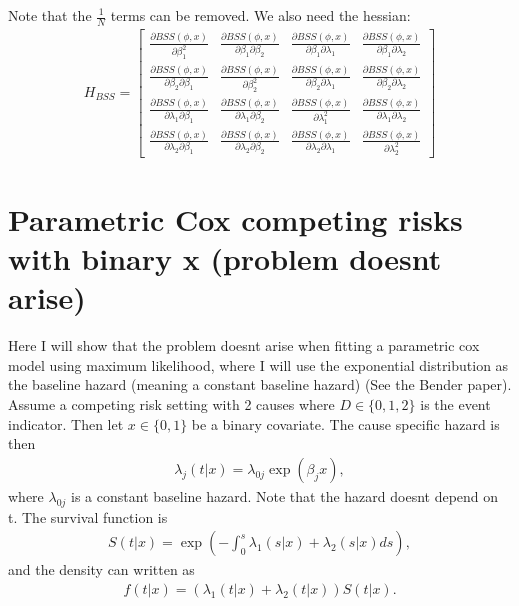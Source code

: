 \documentclass[11pt]{article}
\begin{document}
Note that the \(\frac{1}{N}\) terms can be removed. We also need the hessian:
\begin{align*}
H_{BSS} = 
\begin{bmatrix}
\frac{\partial BSS(\phi,x)}{\partial\beta_1^2} & \frac{\partial BSS(\phi,x)}{\partial\beta_1\partial\beta_2} & \frac{\partial BSS(\phi,x)}{\partial\beta_1\partial\lambda_1} & \frac{\partial BSS(\phi,x)}{\partial\beta_1\partial\lambda_2}\\
\frac{\partial BSS(\phi,x)}{\partial\beta_2\partial\beta_1} & \frac{\partial BSS(\phi,x)}{\partial\beta_2^2} & \frac{\partial BSS(\phi,x)}{\partial\beta_2\partial\lambda_1} & \frac{\partial BSS(\phi,x)}{\partial\beta_2\partial\lambda_2} \\
\frac{\partial BSS(\phi,x)}{\partial\lambda_1\partial\beta_1} & \frac{\partial BSS(\phi,x)}{\partial\lambda_1\partial\beta_2} & \frac{\partial BSS(\phi,x)}{\partial\lambda_1^2} & \frac{\partial BSS(\phi,x)}{\partial\lambda_1\partial\lambda_2} \\
\frac{\partial BSS(\phi,x)}{\partial\lambda_2 \partial\beta_1} & \frac{\partial BSS(\phi,x)}{\partial\lambda_2 \partial\beta_2} & \frac{\partial BSS(\phi,x)}{\partial\lambda_2 \partial\lambda_1} & \frac{\partial BSS(\phi,x)}{\partial\lambda_2^2}
\end{bmatrix}
\end{align*}

\section{Parametric Cox competing risks with binary x (problem doesnt arise)}
\label{sec:org3181b25}
Here I will show that the problem doesnt arise when fitting a parametric cox model using maximum likelihood, where I will use the exponential distribution as the baseline hazard (meaning a constant baseline hazard) (See the Bender paper). Assume a competing risk setting with 2 causes where \(D\in\{0,1,2\}\) is the event indicator. Then let \(x\in\{0,1\}\) be a binary covariate. The cause specific hazard is then
\begin{align*}
\lambda_j(t|x) = \lambda_{0j}\exp(\beta_jx),
\end{align*}
where \(\lambda_{0j}\) is a constant baseline hazard. Note that the hazard doesnt depend on t. The survival function is
\begin{align*}
S(t|x) = \exp\left(-\int_0^s\lambda_1(s|x)+\lambda_2(s|x)ds \right),
\end{align*}
and the density can written as
\begin{align*}
f(t|x) = (\lambda_1(t|x)+\lambda_2(t|x))S(t|x).
\end{align*}
\end{document}

